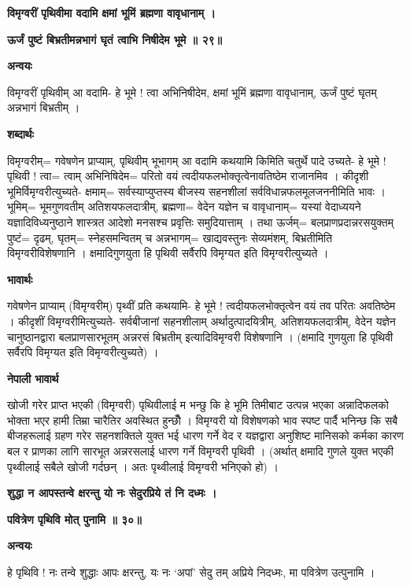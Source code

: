 \documentclass[11pt, a5paper]{article}
\begin{document}
\textbf{विमृग्वरीं पृथिवीमा वदामि क्षमां भूमिं ब्रह्मणा वावृधानाम् ।}

\textbf{ऊर्जं पुष्टं बिभ्रतीमन्नभागं घृतं त्वाभि निषीदेम भूमे ॥ २९॥}

\textbf{अन्वयः}

विमृग्वरीं पृथिवीम् आ वदामि- हे भूमे ! त्वा अभिनिषीदेम, क्षमां भूमिं ब्रह्मणा वावृधानाम्, ऊर्जं पुष्टं घृतम् अन्नभागं बिभ्रतीम् ।

\textbf{शब्दार्थः}

विमृग्वरीम्= गवेषणेन प्राप्याम्, पृथिवीम् भूभागम् आ वदामि कथयामि किमिति चतुर्थे पादे उच्यते- हे भूमे ! पृथिवी ! त्वा= त्वाम् अभिनिषिदेम= परितो वयं त्वदीयफलभोक्तृत्वेनावतिष्ठेम राजानमिव । कीदृशी भूमिर्विमृग्वरीत्युच्यते-  	क्षमाम्= सर्वस्याप्युप्तस्य बीजस्य  सहनशीलां सर्वविधान्नफलमूलजननीमिति भावः । भूमिम्= भूमगुणवतीम् अतिशयफलदात्रीम्, ब्रह्मणा= वेदेन यज्ञेन च वावृधानाम्= यस्यां वेदाध्ययने यज्ञादिविध्यनुष्ठाने शास्त्रत आदेशो मनसश्च प्रवृत्तिः समुदियात्ताम् । तथा ऊर्जम्= बलप्राणप्रदान्नरसयुक्तम् पुष्टं= दृढम्, घृतम्= स्नेहसमन्वितम् च अन्नभागम्= खाद्यवस्तुनः सेव्यमंशम्, बिभ्रतीमिति विमृग्वरीविशेषणानि । क्षमादिगुणयुता हि पृथिवी सर्वैरपि विमृग्यत इति विमृग्वरीत्युच्यते ।

\textbf{भावार्थः}

गवेषणेन प्राप्याम् (विमृग्वरीम्) पृथ्वीं प्रति कथयामि- हे भूमे ! त्वदीयफलभोक्तृत्वेन वयं तव परितः अवतिष्ठेम । कीदृशीं विमृग्वरीमित्युच्यते- सर्वबीजानां सहनशीलाम् अर्थादुत्पादयित्रीम्, अतिशयफलदात्रीम्, वेदेन यज्ञेन चानुष्ठानद्वारा बलप्राणसारभूतम् अन्नरसं बिभ्रतीम्  इत्यादिविमृग्वरी विशेषणानि । (क्षमादि गुणयुता हि पृथिवी सर्वैरपि विमृग्यत इति विमृग्वरीत्युच्यते) ।

\textbf{नेपाली भावार्थ}

खोजी गरेर प्राप्त भएकी (विमृग्वरी) पृथिवीलाई म भन्छु कि हे भूमि तिमीबाट उत्पन्न भएका अन्नादिफलको भोक्ता भएर हामी तिम्रा चारैतिर अवस्थित हुन्छौँ । विमृग्वरी यो विशेषणको भाव स्पष्ट पार्दै भनिन्छ कि सबै बीजहरूलाई ग्रहण गरेर सहनशक्तिले युक्त भई धारण गर्ने वेद र यज्ञद्वारा अनुशिष्ट मानिसको कर्मका कारण बल र प्राणका लागि सारभूत अन्नरसलाई धारण गर्ने विमृग्वरी पृथिवी । (अर्थात् क्षमादि गुणले युक्त भएकी पृथ्वीलाई सबैले खोजी गर्दछन् । अतः पृथ्वीलाई विमृग्वरी भनिएको हो) ।

\textbf{शुद्धा न आपस्तन्वे क्षरन्तु यो नः सेदुरप्रिये तं नि दध्मः ।}

\textbf{पवित्रेण पृथिवि मोत् पुनामि ॥ ३०॥}

\textbf{अन्वयः}

हे पृथिवि ! नः तन्वे शुद्धाः आपः क्षरन्तु, यः नः ‘अपां’ सेदु तम् अप्रिये निदध्मः, मा पवित्रेण उत्पुनामि ।
\end{document}

